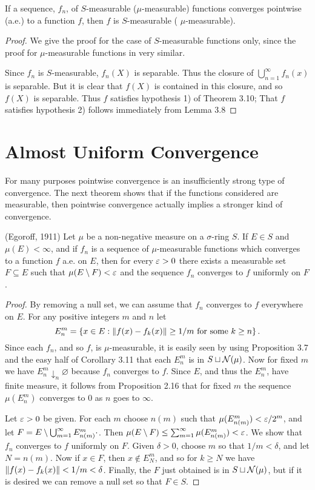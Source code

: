 \begin{proposition}
If a sequence, $f_n$, of $S$-measurable ($\mu$-measurable) functions converges pointwise (a.e.) to a function $f$, then $f$ is $S$-measurable ( $\mu$-measurable).
\end{proposition}

\begin{proof}
We give the proof for the case of $S$-measurable functions only, since the proof for $\mu$-measurable functions in very similar.

Since $f_n$ is $S$-measurable, $f_n(X)$ is separable. Thus the closure of $\bigcup_{n=1}^\infty f_n(x)$ is separable. But it is clear that $f(X)$ is contained in this closure, and so $f(X)$ is separable. Thus $f$ satisfies hypothesis 1) of Theorem 3.10; That $f$ satisfies hypothesis 2) follows immediately from Lemma 3.8
\end{proof}

\section{Almost Uniform Convergence}

For many purposes pointwise convergence is an insufficiently strong type of convergence. The next theorem shows that if the functions considered are measurable, then pointwise convergence actually implies a stronger kind of convergence.

\begin{theorem} (Egoroff, 1911)
Let $\mu$ be a non-negative measure on a $\sigma$-ring $S$. If $E \in S$ and $\mu(E)<\infty$, and if $f_n$ is a sequence of $\mu$-measurable functions which converges to a function $f$ a.e. on $E$, then for every $\varepsilon>0$ there exists a measurable set $F \subseteq E$ such that $\mu(E\setminus F)<\varepsilon$ and the sequence $f_n$ converges to $f$ uniformly on $F$.
\end{theorem}

\begin{proof}
By removing a null set, we can assume that $f_n$ converges to $f$ everywhere on $E$. For any positive integers $m$ and $n$ let $$E_n^m=\left\{x \in E:\norm{f(x)-f_k(x)} \geq 1/m \text { for some } k \geq n\right\}.$$ Since each $f_n$, and so $f$, is $\mu$-measurable, it is easily seen by using Proposition 3.7 and the easy half of Corollary 3.11 that each $E_n^m$ is in $S \sqcup {\cal N}(\mu)$. Now for fixed $m$ we have $E_n^m\downarrow_n\varnothing$ because $f_n$ converges to $f$. Since $E$, and thus the $E_n^m$, have finite measure, it follows from Proposition 2.16 that for fixed $m$ the sequence $\mu(E_n^m)$ converges to $0$ as $n$ goes to $\infty$.

Let $\varepsilon>0$ be given. For each $m$ choose $n(m)$ such that $\mu(E_{n(m)}^m)<\varepsilon/2^m$, and let $F=E\setminus\bigcup_{m=1}^\infty E_{n(m)}^m \cdot$. Then $\mu(E\setminus F)\leq\sum_{m=1}^\infty\mu(E_{n(m)}^m)<\varepsilon$. We show that $f_n$ converges to $f$ uniformly on $F$. Given $\delta>0$, choose $m$ so that $1/m<\delta$, and let $N=n(m)$. Now if $x\in F$, then $x\notin E_N^m$, and so for $k\geq N$ we have $\norm{f(x)-f_k(x)}<1/m<\delta$. Finally, the $F$ just obtained is in $S\sqcup{\cal N}(\mu)$, but if it is desired we can remove a null set so that $F\in S$.
\end{proof}

